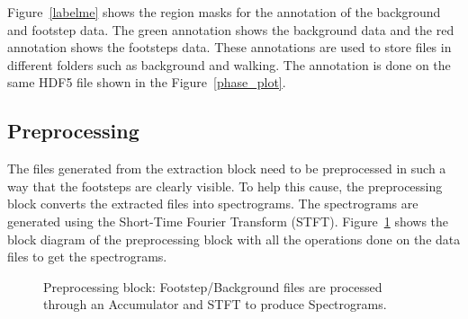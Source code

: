 Figure~\ref{labelme} shows the region masks for the annotation of the background and footstep data. The green annotation shows the background data and the red annotation shows the footsteps data. These annotations are used to store files in different folders such as background and walking. The annotation is done on the same HDF5 file shown in the Figure~\ref{phase_plot}.   

\subsection{Preprocessing}\label{sec:preprocessing}
The files generated from the extraction block need to be preprocessed in such a way that the footsteps are clearly visible. To help this cause, the preprocessing block converts the extracted files into spectrograms. The spectrograms are generated using the Short-Time Fourier Transform (STFT). Figure~\ref{fig:Preprocessing_block} shows the block diagram of the preprocessing block with all the operations done on the data files to get the spectrograms.

\begin{figure}[ht]
  \centering
  \caption{Preprocessing block: Footstep/Background files are processed through an Accumulator and STFT to produce Spectrograms.}
  \label{fig:Preprocessing_block}
\end{figure}

